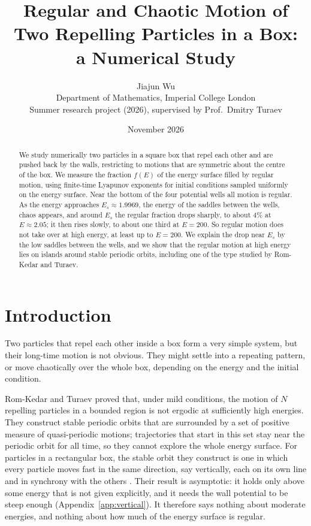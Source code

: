 \documentclass[11pt,a4paper]{article}
\title{Regular and Chaotic Motion of Two Repelling Particles in a Box:\\
a Numerical Study}
\author{Jiajun Wu\\[2pt]
\small Department of Mathematics, Imperial College London\\
\small Summer research project (2026), supervised by Prof.\ Dmitry Turaev}
\date{November 2026}
\begin{document}
\maketitle

\begin{abstract}
We study numerically two particles in a square box that repel each other and
are pushed back by the walls, restricting to motions that are symmetric about
the centre of the box. We measure the fraction $f(E)$ of the energy surface
filled by regular motion, using finite-time Lyapunov exponents for initial
conditions sampled uniformly on the energy surface. Near the bottom of the
four potential wells all motion is regular. As the energy approaches
$E_s\approx1.9969$, the energy of the saddles between the wells, chaos
appears, and around $E_s$ the regular fraction drops sharply, to about $4\%$
at $E\approx2.05$; it then rises slowly, to about one third at $E=200$. So
regular motion does not take over at high energy, at least up to $E=200$. We
explain the drop near $E_s$ by the low saddles between the wells, and we show
that the regular motion at high energy lies on islands around stable periodic
orbits, including one of the type studied by Rom-Kedar and Turaev.
\end{abstract}

\section{Introduction}\label{sec:intro}

Two particles that repel each other inside a box form a very simple system,
but their long-time motion is not obvious. They might settle into a repeating
pattern, or move chaotically over the whole box, depending on the energy and
the initial condition.

Rom-Kedar and Turaev \cite{turaev2022} proved that, under mild conditions,
the motion of $N$ repelling particles in a bounded region is not ergodic at
sufficiently high energies. They construct stable periodic orbits that are
surrounded by a set of positive measure of quasi-periodic motions; trajectories
that start in this set stay near the periodic orbit for all time, so they
cannot explore the whole energy surface. For particles in a rectangular box,
the stable orbit they construct is one in which every particle moves fast in
the same direction, say vertically, each on its own line and in synchrony with
the others \cite[Sec.~2.6]{turaev2022}. Their result is asymptotic: it holds
only above some energy that is not given explicitly, and it needs the wall
potential to be steep enough (Appendix~\ref{app:vertical}). It therefore says
nothing about moderate energies, and nothing about how much of the energy
surface is regular.
\end{document}
